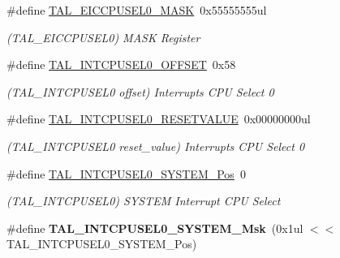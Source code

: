 \begin{DoxyCompactItemize}
\item 
\hypertarget{group___s_a_m_l21___t_a_l_ga34e46fba350cc390fda2c8327527f892}{}\#define \hyperlink{group___s_a_m_l21___t_a_l_ga34e46fba350cc390fda2c8327527f892}{T\+A\+L\+\_\+\+E\+I\+C\+C\+P\+U\+S\+E\+L0\+\_\+\+M\+A\+S\+K}~0x55555555ul\label{group___s_a_m_l21___t_a_l_ga34e46fba350cc390fda2c8327527f892}

\begin{DoxyCompactList}\small\item\em (T\+A\+L\+\_\+\+E\+I\+C\+C\+P\+U\+S\+E\+L0) M\+A\+S\+K Register \end{DoxyCompactList}\item 
\hypertarget{group___s_a_m_l21___t_a_l_ga07f91f92cf64f968a8a8e854228e52eb}{}\#define \hyperlink{group___s_a_m_l21___t_a_l_ga07f91f92cf64f968a8a8e854228e52eb}{T\+A\+L\+\_\+\+I\+N\+T\+C\+P\+U\+S\+E\+L0\+\_\+\+O\+F\+F\+S\+E\+T}~0x58\label{group___s_a_m_l21___t_a_l_ga07f91f92cf64f968a8a8e854228e52eb}

\begin{DoxyCompactList}\small\item\em (T\+A\+L\+\_\+\+I\+N\+T\+C\+P\+U\+S\+E\+L0 offset) Interrupts C\+P\+U Select 0 \end{DoxyCompactList}\item 
\hypertarget{group___s_a_m_l21___t_a_l_ga57836013520251b9442c9552b6962692}{}\#define \hyperlink{group___s_a_m_l21___t_a_l_ga57836013520251b9442c9552b6962692}{T\+A\+L\+\_\+\+I\+N\+T\+C\+P\+U\+S\+E\+L0\+\_\+\+R\+E\+S\+E\+T\+V\+A\+L\+U\+E}~0x00000000ul\label{group___s_a_m_l21___t_a_l_ga57836013520251b9442c9552b6962692}

\begin{DoxyCompactList}\small\item\em (T\+A\+L\+\_\+\+I\+N\+T\+C\+P\+U\+S\+E\+L0 reset\+\_\+value) Interrupts C\+P\+U Select 0 \end{DoxyCompactList}\item 
\hypertarget{group___s_a_m_l21___t_a_l_gaf651f619e5357ce5deb5d1349f0ecb4e}{}\#define \hyperlink{group___s_a_m_l21___t_a_l_gaf651f619e5357ce5deb5d1349f0ecb4e}{T\+A\+L\+\_\+\+I\+N\+T\+C\+P\+U\+S\+E\+L0\+\_\+\+S\+Y\+S\+T\+E\+M\+\_\+\+Pos}~0\label{group___s_a_m_l21___t_a_l_gaf651f619e5357ce5deb5d1349f0ecb4e}

\begin{DoxyCompactList}\small\item\em (T\+A\+L\+\_\+\+I\+N\+T\+C\+P\+U\+S\+E\+L0) S\+Y\+S\+T\+E\+M Interrupt C\+P\+U Select \end{DoxyCompactList}\item 
\hypertarget{group___s_a_m_l21___t_a_l_ga0a9cbbaca817b71b2f17915e4221adc6}{}\#define {\bfseries T\+A\+L\+\_\+\+I\+N\+T\+C\+P\+U\+S\+E\+L0\+\_\+\+S\+Y\+S\+T\+E\+M\+\_\+\+Msk}~(0x1ul $<$$<$ T\+A\+L\+\_\+\+I\+N\+T\+C\+P\+U\+S\+E\+L0\+\_\+\+S\+Y\+S\+T\+E\+M\+\_\+\+Pos)\label{group___s_a_m_l21___t_a_l_ga0a9cbbaca817b71b2f17915e4221adc6}


\end{DoxyCompactItemize}
